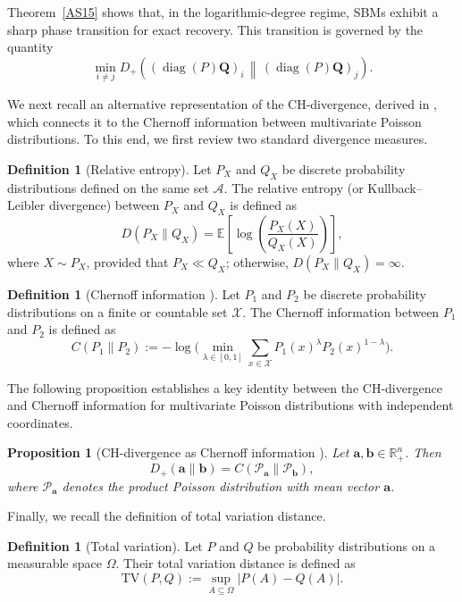 \documentclass[11pt]{article}
\theoremstyle{plain}
\newtheorem{proposition}[theorem]{Proposition}
\theoremstyle{definition}
\newtheorem{definition}[theorem]{Definition}
\newcommand{\E}{\mathbb{E}}
\DeclareMathOperator{\diag}{diag}
\begin{document}
Theorem~\ref{AS15} shows that, in the logarithmic-degree regime, SBMs exhibit a sharp phase transition for exact recovery.
This transition is governed by the quantity
\[
\min_{i\neq j} D_+\!\left((\diag(P)\mathbf{Q})_i \,\middle\|\, (\diag(P)\mathbf{Q})_j\right).
\]

We next recall an alternative representation of the CH-divergence, derived in \citet{asadi2017compressing}, which connects it to the Chernoff information between multivariate Poisson distributions.
To this end, we first review two standard divergence measures.


\begin{definition}[Relative entropy]
Let $P_X$ and $Q_X$ be discrete probability distributions defined on the same set $\mathcal{A}$.
The relative entropy (or Kullback--Leibler divergence) between $P_X$ and $Q_X$ is defined as
\[
D(P_X\|Q_X)
= \E\!\left[\log\!\left(\frac{P_X(X)}{Q_X(X)}\right)\right],
\]
where $X\sim P_X$, provided that $P_X\ll Q_X$; otherwise, $D(P_X\|Q_X)=\infty$.
\end{definition}

\begin{definition}[Chernoff information {\citep{chernoff1952measure}}]
Let $P_1$ and $P_2$ be discrete probability distributions on a finite or countable set $\mathcal{X}$.
The Chernoff information between $P_1$ and $P_2$ is defined as
\begin{equation}\label{Chernoff}
	C(P_1\|P_2)
	:= -\log\Biggl(\min_{\lambda\in[0,1]}
	\sum_{x\in\mathcal{X}} P_1(x)^{\lambda} P_2(x)^{1-\lambda}\Biggr).
\end{equation}
\end{definition}


The following proposition establishes a key identity between the CH-divergence and Chernoff information for multivariate Poisson distributions with independent coordinates.

\begin{proposition}[CH-divergence as Chernoff information \citep{asadi2017compressing}]\label{CHChernoff}
Let $\mathbf{a},\mathbf{b}\in\mathbb{R}_+^n$.
Then
\[
D_+(\mathbf{a}\|\mathbf{b})
= C\!\left(\mathcal{P}_{\mathbf{a}} \middle\| \mathcal{P}_{\mathbf{b}}\right),
\]
where $\mathcal{P}_{\mathbf{a}}$ denotes the product Poisson distribution with mean vector $\mathbf{a}$.
\end{proposition}

Finally, we recall the definition of total variation distance.

\begin{definition}[Total variation]
Let $P$ and $Q$ be probability distributions on a measurable space $\Omega$.
Their total variation distance is defined as
\[
\mathrm{TV}(P,Q)
:= \sup_{A\subseteq \Omega} |P(A)-Q(A)|.
\]
\end{definition}
\end{document}
